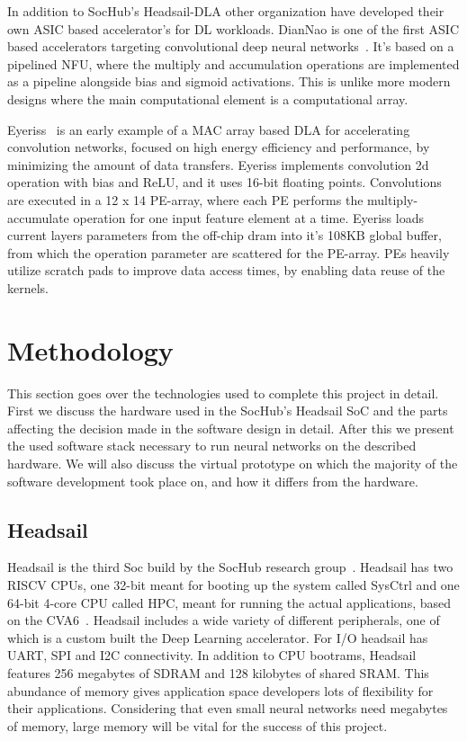 \documentclass[12pt,a4paper,english
]{tunithesis}
\begin{document}
In addition to SocHub's Headsail-DLA other organization have developed their own ASIC based accelerator's for DL workloads.
DianNao is one of the first ASIC based accelerators targeting convolutional deep neural networks~\cite{chen_diannao_2014}. It's based on a pipelined NFU, where the multiply and accumulation operations are implemented as a pipeline alongside bias and sigmoid activations. This is unlike more modern designs where the main computational element is a computational array.

Eyeriss~\cite{chen_eyeriss_2017} is an early example of a MAC array based DLA for accelerating convolution networks, focused on high energy efficiency and performance, by minimizing the amount of data transfers. Eyeriss implements convolution 2d operation with bias and ReLU, and it uses 16-bit floating points. Convolutions are executed in a 12 x 14 PE-array, where each PE performs the multiply-accumulate operation for one input feature element at a time. Eyeriss loads current layers parameters from the off-chip dram into it's 108KB global buffer, from which the operation parameter are scattered for the PE-array. PEs heavily utilize scratch pads to improve data access times, by enabling data reuse of the kernels.

\chapter{Methodology}
This section goes over the technologies used to complete this project in detail. First we discuss the hardware used in the SocHub's Headsail SoC and the parts affecting the decision made in the software design in detail. After this we present the used software stack necessary to run neural networks on the described hardware. We will also discuss the virtual prototype on which the majority of the software development took place on, and how it differs from the hardware.
\label{ch:methodology}

\section{Headsail}
Headsail is the third Soc build by the SocHub research group~\parencite{Ballast}. Headsail has two RISCV CPUs, one 32-bit meant for booting up the system called SysCtrl and one 64-bit 4-core CPU called HPC, meant for running the actual applications, based on the CVA6~\cite{zaruba2019costCVA6}.
Headsail includes a wide variety of different peripherals, one of which is a custom built the Deep Learning accelerator.
For I/O headsail  has UART, SPI and I2C connectivity.
In addition to CPU bootrams, Headsail features 256 megabytes of SDRAM and 128 kilobytes of shared SRAM. This abundance of memory gives application space developers lots of flexibility for their applications. Considering that even small neural networks need megabytes of memory, large memory will be vital for the success of this project.
\end{document}
